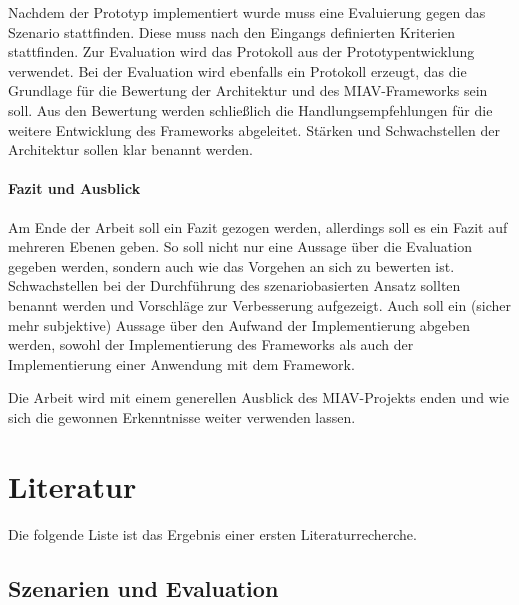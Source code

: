 \documentclass[12pt,headsepline,a4paper,bibtotoc,liststotoc,DIV12,BCOR12mm]{scrartcl}
\begin{document}
  Nachdem der Prototyp implementiert wurde muss eine Evaluierung gegen das Szenario stattfinden. Diese muss nach den Eingangs definierten Kriterien stattfinden. Zur Evaluation wird das Protokoll aus der Prototypentwicklung verwendet. Bei der Evaluation wird ebenfalls ein Protokoll erzeugt, das die Grundlage für die Bewertung der Architektur und des MIAV-Frameworks sein soll. Aus den Bewertung werden schließlich die Handlungsempfehlungen für die weitere Entwicklung des Frameworks abgeleitet. Stärken und Schwachstellen der Architektur sollen klar benannt werden.


\paragraph{Fazit und Ausblick} %
\label{par:fazit_und_ausblick}

  Am Ende der Arbeit soll ein Fazit gezogen werden, allerdings soll es ein Fazit auf mehreren Ebenen geben. So soll nicht nur eine Aussage über die Evaluation gegeben werden, sondern auch wie das Vorgehen an sich zu bewerten ist. Schwachstellen bei der Durchführung des szenariobasierten Ansatz sollten benannt werden und Vorschläge zur Verbesserung aufgezeigt. Auch soll ein (sicher mehr subjektive) Aussage über den Aufwand der Implementierung abgeben werden, sowohl der Implementierung des Frameworks als auch der Implementierung einer Anwendung mit dem Framework.
  
  Die Arbeit wird mit einem generellen Ausblick des MIAV-Projekts enden und wie sich die gewonnen Erkenntnisse weiter verwenden lassen.



\section{Literatur} %
\label{sec:literatur}

  Die folgende Liste ist das Ergebnis einer ersten Literaturrecherche.
  
\subsection{Szenarien und Evaluation} %
\label{sub:szenarien_und_evaluation}
\end{document}
